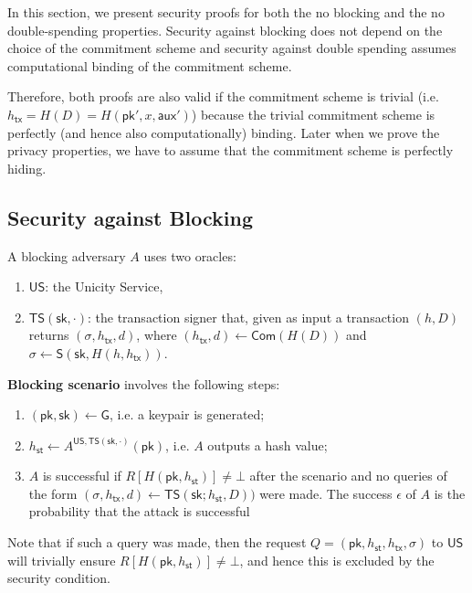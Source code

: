 \documentclass{article}
\newcommand{\pubkey}[0]{\mathsf{pk}}
\newcommand{\prikey}[0]{\mathsf{sk}}
\newcommand{\commit}[0]{\mathsf{Com}}
\newcommand{\sthash}[0]{{h_\mathsf{st}}}
\newcommand{\txhash}[0]{{h_\mathsf{tx}}}
\newcommand{\auxd}[0]{\mathsf{aux}}
\begin{document}
\noindent In this section, we present security proofs for both the no blocking and the no double-spending properties. Security against blocking does not depend on the choice of the commitment scheme and security against double spending assumes computational binding of the commitment scheme.

Therefore, both proofs are also valid if the commitment scheme is trivial (i.e. $\txhash = H(D)=H(\pubkey',x,\auxd')$) because the trivial commitment scheme is perfectly (and hence also computationally) binding. Later when we prove the privacy properties, we have to assume that the commitment scheme is perfectly hiding.



\subsection{Security against Blocking}\label{sec:blocking}

A blocking adversary $A$ uses two oracles:
\begin{enumerate}
\item $\mathsf{US}$: the Unicity Service,
\item $\mathsf{TS}(\prikey,\cdot)$: the transaction signer that, given as input a transaction $(h,D)$ returns $(\sigma, \txhash, d)$, where
$(\txhash, d)\gets \commit(H(D))$ and
$\sigma \gets \mathsf{S}(\prikey,H(h,\txhash))$.
\end{enumerate}

\noindent\textbf{Blocking scenario} involves the following steps:
\begin{enumerate}
\item $(\pubkey,\prikey)\gets \mathsf{G}$, i.e. a keypair is generated;
\item $h_\mathsf{st}\gets A^{\mathsf{US},\mathsf{TS}(\prikey,\cdot)}(\pubkey)$, i.e. $A$ outputs a hash value;
\item $A$ is successful if
$R[H(\pubkey,h_\mathsf{st})]\neq\bot$ after the scenario and no queries of the form $(\sigma,\txhash,d)\gets\mathsf{TS}(\prikey;h_\mathsf{st},D))$ were made.
The success $\epsilon$ of $A$ is the probability that the attack is successful
\end{enumerate}

\noindent Note that if such a query was made, then the request $Q=(\pubkey,\sthash, \txhash,\sigma)$ to $\mathsf{US}$ will trivially ensure $R[H(\pubkey,h_\mathsf{st})]\neq\bot$, and hence this is excluded by the security condition. \medskip
\end{document}

